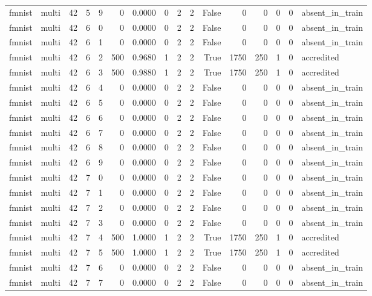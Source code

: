 \begin{tabular}{llrrrrrrrrrrrrrl}
fmnist & multi & 42 & 5 & 9 & 0 & 0.0000 & 0 & 2 & 2 & False & 0 & 0 & 0 & 0 & absent\_in\_train \\
fmnist & multi & 42 & 6 & 0 & 0 & 0.0000 & 0 & 2 & 2 & False & 0 & 0 & 0 & 0 & absent\_in\_train \\
fmnist & multi & 42 & 6 & 1 & 0 & 0.0000 & 0 & 2 & 2 & False & 0 & 0 & 0 & 0 & absent\_in\_train \\
fmnist & multi & 42 & 6 & 2 & 500 & 0.9680 & 1 & 2 & 2 & True & 1750 & 250 & 1 & 0 & accredited \\
fmnist & multi & 42 & 6 & 3 & 500 & 0.9880 & 1 & 2 & 2 & True & 1750 & 250 & 1 & 0 & accredited \\
fmnist & multi & 42 & 6 & 4 & 0 & 0.0000 & 0 & 2 & 2 & False & 0 & 0 & 0 & 0 & absent\_in\_train \\
fmnist & multi & 42 & 6 & 5 & 0 & 0.0000 & 0 & 2 & 2 & False & 0 & 0 & 0 & 0 & absent\_in\_train \\
fmnist & multi & 42 & 6 & 6 & 0 & 0.0000 & 0 & 2 & 2 & False & 0 & 0 & 0 & 0 & absent\_in\_train \\
fmnist & multi & 42 & 6 & 7 & 0 & 0.0000 & 0 & 2 & 2 & False & 0 & 0 & 0 & 0 & absent\_in\_train \\
fmnist & multi & 42 & 6 & 8 & 0 & 0.0000 & 0 & 2 & 2 & False & 0 & 0 & 0 & 0 & absent\_in\_train \\
fmnist & multi & 42 & 6 & 9 & 0 & 0.0000 & 0 & 2 & 2 & False & 0 & 0 & 0 & 0 & absent\_in\_train \\
fmnist & multi & 42 & 7 & 0 & 0 & 0.0000 & 0 & 2 & 2 & False & 0 & 0 & 0 & 0 & absent\_in\_train \\
fmnist & multi & 42 & 7 & 1 & 0 & 0.0000 & 0 & 2 & 2 & False & 0 & 0 & 0 & 0 & absent\_in\_train \\
fmnist & multi & 42 & 7 & 2 & 0 & 0.0000 & 0 & 2 & 2 & False & 0 & 0 & 0 & 0 & absent\_in\_train \\
fmnist & multi & 42 & 7 & 3 & 0 & 0.0000 & 0 & 2 & 2 & False & 0 & 0 & 0 & 0 & absent\_in\_train \\
fmnist & multi & 42 & 7 & 4 & 500 & 1.0000 & 1 & 2 & 2 & True & 1750 & 250 & 1 & 0 & accredited \\
fmnist & multi & 42 & 7 & 5 & 500 & 1.0000 & 1 & 2 & 2 & True & 1750 & 250 & 1 & 0 & accredited \\
fmnist & multi & 42 & 7 & 6 & 0 & 0.0000 & 0 & 2 & 2 & False & 0 & 0 & 0 & 0 & absent\_in\_train \\
fmnist & multi & 42 & 7 & 7 & 0 & 0.0000 & 0 & 2 & 2 & False & 0 & 0 & 0 & 0 & absent\_in\_train \\

\end{tabular}
